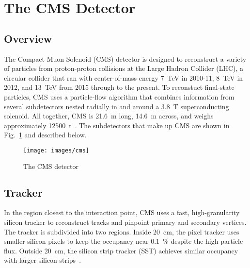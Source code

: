 \documentclass[12pt]{article}
\begin{document}
\section{The CMS Detector}
    \subsection{Overview}
        The Compact Muon Solenoid (CMS) detector is designed to reconstruct a variety of particles from proton-proton collisions at the Large Hadron Collider (LHC), a circular collider that ran with center-of-mass energy \SI{7}{\tera\electronvolt} in 2010-11, \SI{8}{\tera\electronvolt} in 2012, and \SI{13}{\tera\electronvolt} from 2015 through to the present. To reconstuct final-state particles, CMS uses a particle-flow algorithm that combines information from several subdetectors nested radially in and around a \SI{3.8}{\tesla} superconducting solenoid. All together, CMS is \SI{21.6}{\m} long, \SI{14.6}{\m} across, and weighs approximately \SI{12500}{t}~\cite{cms_experiment}. The subdetectors that make up CMS are shown in Fig.~\ref{cms} and described below.

        \noindent \begin{figure}[htbp] \begin{center}
        \texttt{[image: images/cms]}
        \caption{The CMS detector~\cite{cms_image}}
        \label{cms}
        \end{center} \end{figure}

    \subsection{Tracker}
        In the region closest to the interaction point, CMS uses a fast, high-granularity silicon tracker to reconstruct tracks and pinpoint primary and secondary vertices. The tracker is subdivided into two regions. Inside \SI{20}{cm}, the pixel tracker  uses smaller silicon pixels to keep the occupancy near \SI{0.1}{\percent} despite the high particle flux. Outside \SI{20}{\cm}, the silicon strip tracker (SST) achieves similar occupancy with larger silicon strips~\cite{cms_tdr}.  
\end{document}
